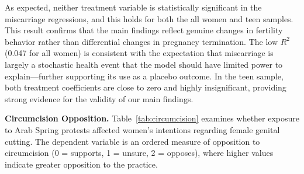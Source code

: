\documentclass[12pt,a4paper]{article}
\begin{document}
\noindent As expected, neither treatment variable is statistically significant in the miscarriage regressions, and this holds for both the all women and teen samples. This result confirms that the main findings reflect genuine changes in fertility behavior rather than differential changes in pregnancy termination. The low $R^2$ (0.047 for all women) is consistent with the expectation that miscarriage is largely a stochastic health event that the model should have limited power to explain---further supporting its use as a placebo outcome. In the teen sample, both treatment coefficients are close to zero and highly insignificant, providing strong evidence for the validity of our main findings.
\vspace{0.25cm}


\noindent \textbf{Circumcision Opposition.} Table~\ref{tab:circumcision} examines whether exposure to Arab Spring protests affected women's intentions regarding female genital cutting. The dependent variable is an ordered measure of opposition to circumcision (0 = supports, 1 = unsure, 2 = opposes), where higher values indicate greater opposition to the practice.

\vspace{0.25cm}
\end{document}
